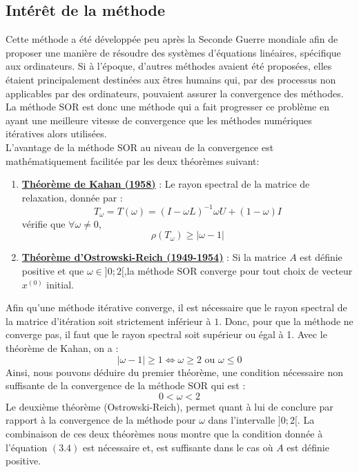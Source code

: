\subsection{Intérêt de la méthode}
Cette méthode a été développée peu après la Seconde Guerre mondiale afin de proposer une manière de résoudre des systèmes d'équations linéaires, spécifique aux ordinateurs. Si à l'époque, d'autres méthodes avaient été proposées, elles étaient principalement destinées aux êtres humains qui, par des processus non applicables par des ordinateurs, pouvaient assurer la convergence des méthodes. La méthode SOR est donc une méthode qui a fait progresser ce problème en ayant une meilleure vitesse de convergence que les méthodes numériques itératives alors utilisées.\\

L'avantage de la méthode SOR au niveau de la convergence est mathématiquement facilitée par les deux théorèmes suivant:
\begin{enumerate}
	\item \textbf{\underline{Théorème de Kahan (1958)}} : Le rayon spectral de la matrice de relaxation, donnée par :
	$$
	T_\omega=T(\omega)=(I-\omega L)^{-1}{\omega U +(1-\omega)I}
	$$
	vérifie que $\forall \omega \neq 0$,
	$$
	\rho(T_\omega)\geq|\omega -1|
	$$
	\item \textbf{\underline{Théorème d'Ostrowski-Reich (1949-1954)}} : Si la matrice $A$ est définie positive et que $\omega \in ]0;2[$,la méthode SOR converge pour tout choix de vecteur $x^{(0)}$ initial.
\end{enumerate}
Afin qu'une méthode itérative converge, il est nécessaire que le rayon spectral de la matrice d'itération soit strictement inférieur à $1$. Donc, pour que la méthode ne converge pas, il faut que le rayon spectral soit supérieur ou égal à 1. Avec le théorème de Kahan, on a :
$$
|\omega -1|\geq 1 \Leftrightarrow \omega \geq 2 \text{ ou } \omega \leq 0 
$$
Ainsi, nous pouvons déduire du premier théorème, une condition nécessaire non suffisante de la convergence de la méthode SOR qui est :
\begin{equation}
0<\omega<2
\end{equation}
Le deuxième théorème (Ostrowski-Reich), permet quant à lui de conclure par rapport à la convergence de la méthode pour $\omega$ dans l'intervalle $]0;2[$. La combinaison de ces deux théorèmes nous montre que la condition donnée à l'équation $(3.4)$ est nécessaire et, est suffisante dans le cas où $A$ est définie positive.\\

